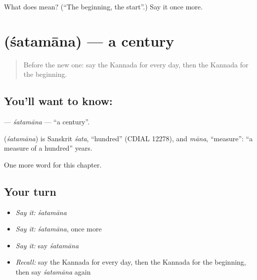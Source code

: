 \begin{tcolorbox}[breakable,colback=teal!4,colframe=teal!35!black,title={Before you move on}]
What does  mean? (\textquotedblleft{}The beginning, the start\textquotedblright{}.) Say it once more.
\end{tcolorbox}
\section[\texorpdfstring{\kn{ಶತಮಾನ} (śatamāna)}{ಶತಮಾನ (śatamāna)}]{ (śatamāna) — a century}

\label{lesson:KA-C172-satamana}



\begin{quote}
Before the new one: say the Kannada for every day, then the Kannada for the beginning.
\end{quote}

\subsection*{You'll want to know: }
\textbf{} — \emph{śatamāna} — \textquotedblleft{}a century\textquotedblright{}.

\begin{cousinweb}
\textbf{} (\emph{śatamāna}) is Sanskrit \emph{śata}, \textquotedblleft{}hundred\textquotedblright{} (CDIAL 12278), and \emph{māna}, \textquotedblleft{}measure\textquotedblright{}: \textquotedblleft{}a measure of a hundred\textquotedblright{} years.
\end{cousinweb}

\begin{grammarlens}[title={What you've built}]
One more word for this chapter.
\end{grammarlens}

\subsection*{Your turn}
\begin{itemize}
\raggedright
  \item \emph{Say it:} \emph{śatamāna}
  \item \emph{Say it:} \emph{śatamāna}, once more
  \item \emph{Say it:} say \emph{śatamāna}
  \item \emph{Recall:} say the Kannada for every day, then the Kannada for the beginning, then say \emph{śatamāna} again
\end{itemize}

